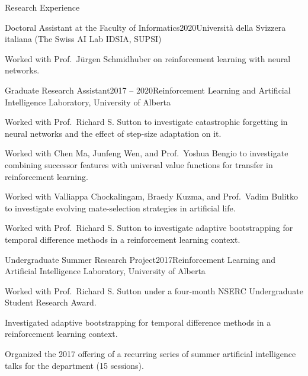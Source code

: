\documentclass{cv}
\begin{document}
\pagebreak


\begin{rSection}{Research Experience}

\begin{rSubsection}{Doctoral Assistant at the Faculty of Informatics}{2020}{Universit{\`{a}} della Svizzera italiana (The Swiss AI Lab IDSIA, SUPSI)}
\item Worked with Prof.~J{\"u}rgen Schmidhuber on reinforcement learning with neural networks.
\end{rSubsection}


\begin{rSubsection}{Graduate Research Assistant}{2017 -- 2020}{Reinforcement Learning and Artificial Intelligence Laboratory, University of Alberta}
\item Worked with Prof.~Richard S. Sutton to investigate catastrophic forgetting in neural networks and the effect of step-size adaptation on it.
\item Worked with Chen Ma, Junfeng Wen, and Prof.~Yoshua Bengio to investigate combining successor features with universal value functions for transfer in reinforcement learning.
\item Worked with Valliappa Chockalingam, Braedy Kuzma, and Prof.~Vadim Bulitko to investigate evolving mate-selection strategies in artificial life.
\item Worked with Prof.~Richard S. Sutton to investigate adaptive bootstrapping for temporal difference methods in a reinforcement learning context.
\end{rSubsection}


\begin{rSubsection}{Undergraduate Summer Research Project}{2017}{Reinforcement Learning and Artificial Intelligence Laboratory, University of Alberta}
\item Worked with Prof.~Richard S. Sutton under a four-month NSERC Undergraduate Student Research Award.
\item Investigated adaptive bootstrapping for temporal difference methods in a reinforcement learning context.
\item Organized the 2017 offering of a recurring series of summer artificial intelligence talks for the department (15 sessions).
\end{rSubsection}


\end{rSection}
\end{document}
